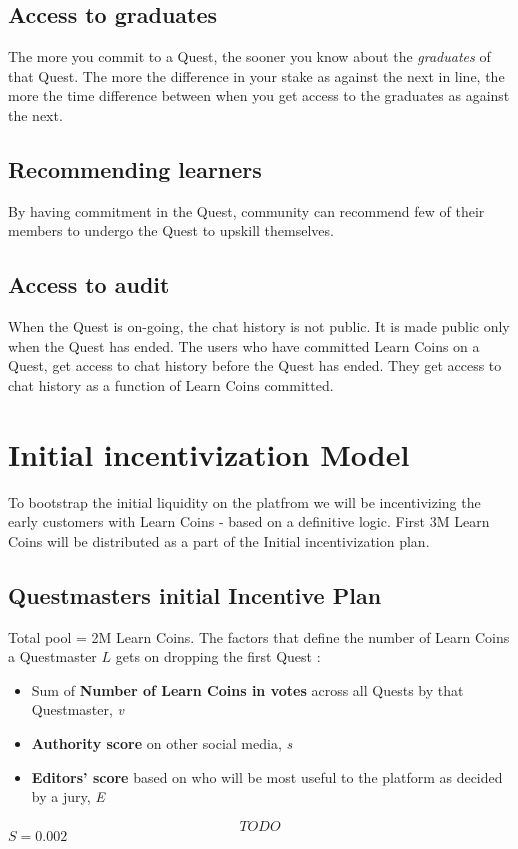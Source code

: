 \documentclass{article}
\begin{document}
    \subsection{Access to graduates}
      The more you commit to a Quest, the sooner you know about the \textit{graduates} of that Quest.
      The more the difference in your stake as against the next in line, the more the time difference between when you get access to the graduates as against the next. %
    \subsection{Recommending learners}
      By having commitment in the Quest, community can recommend few of their members to undergo the Quest to upskill themselves.
    \subsection{Access to audit}
      When the Quest is on-going, the chat history is not public. It is made public only when the Quest has ended.
      The users who have committed Learn Coins on a Quest, get access to chat history before the Quest has ended. 
      They get access to chat history as a function of Learn Coins committed.

  \section{Initial incentivization Model}
    To bootstrap the initial liquidity on the platfrom we will be incentivizing the early customers with Learn Coins - based on a definitive logic.
    First 3M Learn Coins will be distributed as a part of the Initial incentivization plan.
    \subsection{Questmasters initial Incentive Plan}
      Total pool = 2M Learn Coins.
      The factors that define the number of Learn Coins a Questmaster \(L\) gets on dropping the first Quest :
      \begin{itemize}
        \item Sum of \textbf{Number of Learn Coins in votes} across all Quests by that Questmaster, \textit{v}
        \item \textbf{Authority score} on other social media, \textit{s}
        \item \textbf{Editors' score} based on who will be most useful to the platform as decided by a jury, \textit{E}
      \end{itemize} 
      \[
        TODO
      \]
      \(S = 0.002\)
\end{document}
